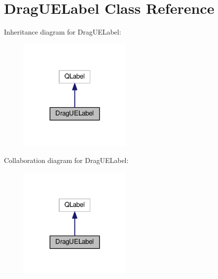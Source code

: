 \hypertarget{class_drag_u_e_label}{}\section{Drag\+U\+E\+Label Class Reference}
\label{class_drag_u_e_label}


Inheritance diagram for Drag\+U\+E\+Label\+:
\nopagebreak
\begin{figure}[H]
\begin{center}
\leavevmode
\includegraphics[width=155pt]{class_drag_u_e_label__inherit__graph}
\end{center}
\end{figure}


Collaboration diagram for Drag\+U\+E\+Label\+:
\nopagebreak
\begin{figure}[H]
\begin{center}
\leavevmode
\includegraphics[width=155pt]{class_drag_u_e_label__coll__graph}
\end{center}
\end{figure}
